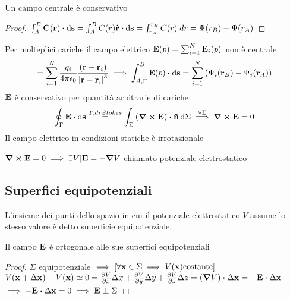 \documentclass[12pt,a4paper]{article}
\begin{document}
\begin{proposition}
    Un campo centrale è conservativo 
\end{proposition}
\begin{proof}
    $\int_{A}^{B}\vb{C}(\vb{r})\vdot \dd{\vb{s}}=\int_{A}^{B}C(r)\vu{r}\vdot \dd{\vb{s}}=\int_{r_A}^{r_B}C(r)\;dr= \Psi(r_B)-\Psi(r_A)$
\end{proof}
Per molteplici cariche il campo elettrico $\vb{E}(p)= \sum_{i=1}^{N} \vb{E}_i(p) $ non è centrale
\begin{equation*}
    = \sum_{i=1}^{N}\frac{q_i}{4\pi\epsilon_0}\frac{(\vb{r}-\vb{r}_i)}{\abs{\vb{r}-\vb{r}_i}^3}\implies\int_{A,\Gamma}^{B}\vb{E}(p)\vdot \dd{\vb{s}}
    =\sum_{i=1}^{N}\left( \Psi_i(\vb{r}_B)-\Psi_i(\vb{r}_A) \right) 
\end{equation*}
$\vb{E}$ è conservativo per quantità arbitrarie di cariche
\begin{equation*}
    \oint_\Gamma \vb{E}\vdot \dd{\vb{s}} \overset{T.di\,Stokes}{=}\int_{\Sigma} \left( \curl \vb{E} \right)\vdot \vu{n}\dd{\Sigma}
    \overset{\forall\Sigma}{\implies}\curl\vb{E}=0
\end{equation*}
Il campo elettrico in condizioni statiche è irrotazionale
\begin{definition}
    $\curl\vb{E}=0\implies \exists V | \vb{E}=- \grad V$ chiamato potenziale elettrostatico
\end{definition}

\subsection{Superfici equipotenziali}
\begin{definition}
    L'insieme dei punti dello spazio in cui il potenziale elettrostatico $V$ assume lo stesso valore
    è detto superficie equipotenziale.   
\end{definition}

\begin{proposition}
    Il campo $\vb{E}$ è ortogonale alle sue superfici equipotenziali
\end{proposition}
\begin{proof}
    $\Sigma$ equipotenziale $\implies\left[ \forall \vb{x} \in\Sigma \implies V(\vb{x}) \text{costante} \right]$
    \\$V(\vb{x}+\Delta\vb{x})-V(\vb{x})\simeq0=\pdv{V}{x}\Delta x+\pdv{V}{y}\Delta y+\pdv{V}{z}\Delta z= (\grad V)\vdot\Delta\vb{x}= - \vb{E}\vdot\Delta\vb{x}$
    \\$\implies-\vb{E}\vdot\Delta\vb{x}=0\implies\vb{E}\perp\Sigma$
\end{proof}
\end{document}
